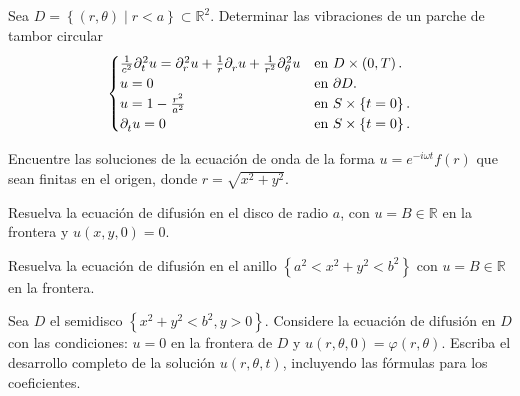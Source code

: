 Sea
\begin{math}
	D=
	\left\{
	\left(r,\theta\right)\mid
	r<a
	\right\}\subset\mathbb{R}^{2}
\end{math}.
Determinar las vibraciones de un parche de tambor circular
\begin{equation*}
	\begin{cases}
		\frac{1}{c^{2}}\difcp[2]{u}{t}=
		\difcp[2]{u}{r}
		+\frac{1}{r}\difcp{u}{r}
		+\frac{1}{r^{2}}\difcp[2]{u}{\theta} &
		\text{en }D\times\left(0,T\right).     \\
		u=0                                  &
		\text{en }\partial D.                  \\
		u=1-\frac{r^{2}}{a^{2}}              &
		\text{en }S\times\left\{t=0\right\}.   \\
		\difcp{u}{t}=
		0                                    &
		\text{en }S\times\left\{t=0\right\}.
	\end{cases}
\end{equation*}

\question

Encuentre las soluciones de la ecuación de onda de la forma
\begin{math}
	u=e^{-i\omega t}
	f\left(r\right)
\end{math}
que sean finitas en el origen, donde
\begin{math}
	r=\sqrt{x^{2}+y^{2}}
\end{math}.

\question

Resuelva la ecuación de difusión en el disco de radio $a$, con
$u=B\in\mathbb{R}$ en la frontera y $u\left(x,y,0\right)=0$.

\question

Resuelva la ecuación de difusión en el anillo
\begin{math}
	\left\{
	a^{2}<
	x^{2}+y^{2}<
	b^{2}
	\right\}
\end{math}
con $u=B\in\mathbb{R}$ en la frontera.

\question

Sea $D$ el semidisco
\begin{math}
	\left\{
	x^{2}+y^{2}<
	b^{2},
	y>0
	\right\}
\end{math}.
Considere la ecuación de difusión en $D$ con las condiciones:
$u=0$ en la frontera de $D$ y
\begin{math}
	u\left(r,\theta,0\right)=
	\varphi\left(r,\theta\right)
\end{math}.
Escriba el desarrollo completo de la solución
$u\left(r,\theta,t\right)$, incluyendo las fórmulas para los
coeficientes.


